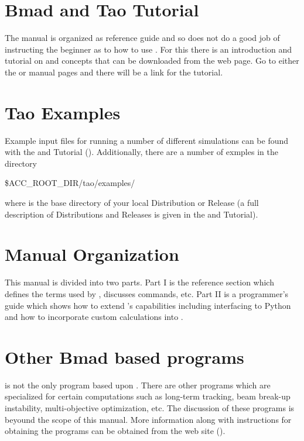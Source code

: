 \section{Bmad and Tao Tutorial}
\label{s:tutorial}

\vspace{0.1in}
The \tao manual is organized as reference guide and so does not do a good job of instructing the
beginner as to how to use \tao. For this there is an introduction and tutorial on \bmad and \tao
concepts that can be downloaded from the \bmad web page. Go to either the \bmad or \tao manual pages
and there will be a link for the tutorial.

\section{Tao Examples}
\label{s:examples}

Example input files for running a number of different simulations can be found with the \bmad and \tao
Tutorial (). Additionally, there are a number of exmples in the directory
\begin{example}
  \$ACC_ROOT_DIR/tao/examples/
\end{example}
where  is the base directory of your local \bmad Distribution or Release (a full description
of \bmad Distributions and Releases is given in the \bmad and \tao Tutorial).

\section{Manual Organization}

This manual is divided into two parts. Part I is the reference section which defines the terms used
by \tao, discusses \tao commands, etc. Part II is a programmer's guide which shows how to extend
\tao's capabilities including interfacing to Python and how to incorporate custom calculations into
\tao.

\section{Other Bmad based programs}
\label{s:other}

\tao is not the only program based upon \bmad. There are other programs which are specialized for
certain computations such as long-term tracking, beam break-up instability, multi-objective
optimization, etc. The discussion of these programs is beyound the scope of this manual. More
information along with instructions for obtaining the programs can be obtained from the \bmad web site ().

